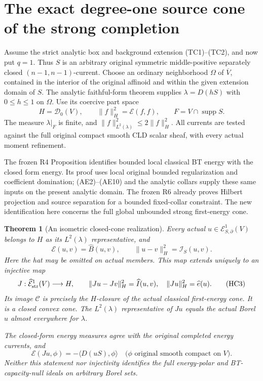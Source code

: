 \documentclass[11pt,a4paper]{article}
\numberwithin{equation}{section}
\newtheorem{theorem}{Theorem}[section]
\theoremstyle{definition}
\theoremstyle{remark}
\begin{document}


\section{The exact degree-one source cone of the strong completion}
\label{sec:r11-first-energy-Hilbert-source-cone}

Assume the strict analytic box and background extension
(TC1)--(TC2), and now put $q=1$. Thus $S$ is an arbitrary
original symmetric middle-positive separately closed
$(n-1,n-1)$-current. Choose an ordinary neighborhood $\Omega$
of $\overline V$, contained in the interior of the original
affinoid and within the given extension domain of $S$.
The analytic faithful-form theorem supplies
$\lambda=D(hS)$ with $0\leq h\leq1$ on $\Omega$.
Use its coercive part space
\[
                 H=\mathscr D_0(V),\qquad
                 \|f\|_H^2=\mathcal E(f,f),\qquad
                 F=V\cap\operatorname{supp}S.
 \tag{HC1}
\]
The measure $\lambda|_F$ is finite, and
$\|f\|_{L^2(\lambda)}^2\leq2\|f\|_H^2$.
All currents are tested against the full original compact
smooth CLD scalar sheaf, with every actual moment refinement.

The frozen R4 Proposition 
identifies bounded local classical BT energy with the closed
form energy. Its proof uses local original bounded
regularization and coefficient domination; (AE2)--(AE10)
and the analytic collars supply these same inputs on the
present analytic domain. The frozen R6
 already proves
Hilbert projection and source separation for a bounded
fixed-collar constraint. The new identification here concerns
the full global unbounded strong first-energy cone.

\begin{theorem}[An isometric closed-cone realization]
\label{thm:r11-first-energy-closed-Hilbert-cone}
Every actual $u\in\mathcal E^1_{S,\partial}(V)$ belongs to
$H$ as its $L^2(\lambda)$ representative, and
\[
 \mathcal E(u,v)=\widehat B(u,v),\qquad
 \|u-v\|_H^2=\mathscr I_S(u,v).
 \tag{HC2}
\]
Here the hat may be omitted on actual members. This map
extends uniquely to an injective map
\[
 J:\widehat{\mathcal E}^1_{\rm str}(V)\longrightarrow H,
 \qquad
 \|Ju-Jv\|_H^2=\widehat I(u,v),\quad
 \|Ju\|_H^2=\widehat e(u).
 \tag{HC3}
\]
Its image $\mathcal C$ is precisely the $H$-closure of the
actual classical first-energy cone. It is a closed convex
cone. The $L^2(\lambda)$ representative of $Ju$ equals the
actual Borel $u$ almost everywhere for $\lambda$.

The closed-form energy measures agree with the original
completed energy currents, and
\[
       \mathcal E(Ju,\phi)=-\langle D(uS),\phi\rangle
            \quad\bigl(\phi\text{ original smooth compact on }V\bigr).
 \tag{HC4}
\]
Neither this statement nor injectivity identifies the full
energy-polar and BT-capacity-null ideals on arbitrary Borel sets.
\end{theorem}
\end{document}
